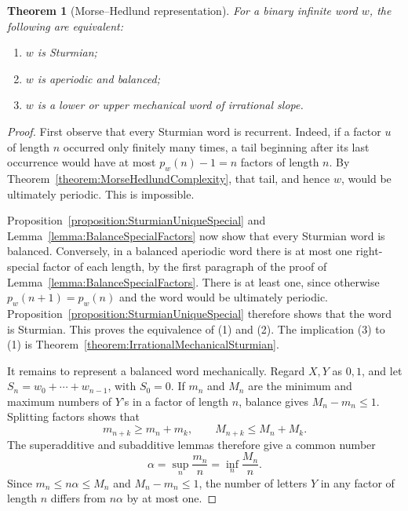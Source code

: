 \documentclass{book}
\newtheorem{theorem}[definition]{Theorem}
\begin{document}
\begin{theorem}[Morse--Hedlund representation]
  \label{theorem:SturmianCharacterizations}
  For a binary infinite word \(w\), the following are equivalent:
  \begin{enumerate}
    \item \(w\) is Sturmian;
    \item \(w\) is aperiodic and balanced;
    \item \(w\) is a lower or upper mechanical word of irrational slope.
  \end{enumerate}
\end{theorem}
\begin{proof}
  First observe that every Sturmian word is recurrent.  Indeed, if a factor
  \(u\) of length \(n\) occurred only finitely many times, a tail beginning
  after its last occurrence would have at most
  \(p_w(n)-1=n\) factors of length \(n\).  By
  Theorem~\ref{theorem:MorseHedlundComplexity}, that tail, and hence \(w\),
  would be ultimately periodic.  This is impossible.

  Proposition~\ref{proposition:SturmianUniqueSpecial} and
  Lemma~\ref{lemma:BalanceSpecialFactors} now show that every Sturmian word
  is balanced.  Conversely, in a balanced aperiodic word there is at most
  one right-special factor of each length, by the first paragraph of the
  proof of Lemma~\ref{lemma:BalanceSpecialFactors}.  There is at least one,
  since otherwise \(p_w(n+1)=p_w(n)\) and the word would be ultimately
  periodic.  Proposition~\ref{proposition:SturmianUniqueSpecial} therefore
  shows that the word is Sturmian.  This proves the equivalence of (1) and
  (2).  The implication (3) to (1) is
  Theorem~\ref{theorem:IrrationalMechanicalSturmian}.

  It remains to represent a balanced word mechanically.  Regard \(X,Y\) as
  \(0,1\), and let \(S_n=w_0+\cdots+w_{n-1}\), with \(S_0=0\).  If \(m_n\)
  and \(M_n\) are the minimum and maximum numbers of \(Y\)'s in a factor of
  length \(n\), balance gives \(M_n-m_n\leq1\).  Splitting factors shows
  that
  \[
    m_{n+k}\geq m_n+m_k,
    \qquad M_{n+k}\leq M_n+M_k.
  \]
  The superadditive and subadditive lemmas therefore give a common number
  \[
    \alpha=\sup_n\frac{m_n}{n}
           =\inf_n\frac{M_n}{n}.
  \]
  Since \(m_n\leq n\alpha\leq M_n\) and \(M_n-m_n\leq1\), the number of
  letters \(Y\) in any factor of length \(n\) differs from \(n\alpha\) by
  at most one.


\end{proof}
\end{document}

